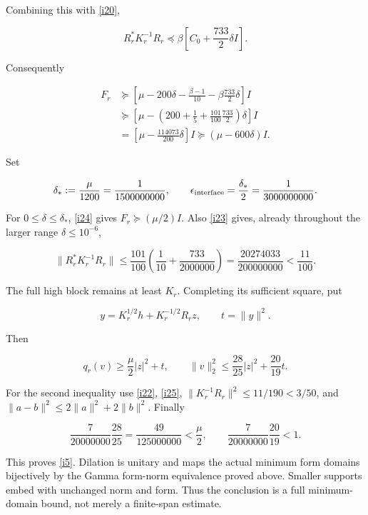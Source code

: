 \documentclass[11pt]{article}
\begin{document}
Combining this with \eqref{i20},

\begin{equation}\label{i23}
R_r^*K_r^{-1}R_r
 \preceq\beta\left[C_0+\frac{733}2\delta I\right].
\end{equation}

Consequently

\begin{equation}\label{i24}
\begin{split}
 F_r&\succeq
 \left[\mu-200\delta-\frac{\beta-1}{10}
                 -\beta\frac{733}2\delta\right]I\\
 &\succeq\left[\mu-
 \left(200+\frac15+\frac{101}{100}\frac{733}2\right)\delta\right]I\\
 &=\left[\mu-\frac{114073}{200}\delta\right]I
 \succeq(\mu-600\delta)I.
 \end{split}
\end{equation}

Set

\[
 \delta_*:=\frac\mu{1200}=\frac1{1500000000},\qquad
 \epsilon_{\rm interface}=\frac{\delta_*}2=\frac1{3000000000}.
\]

For \(0\le\delta\le\delta_*\), \eqref{i24} gives \(F_r\succeq(\mu/2)I\). Also \eqref{i23} gives, already throughout the larger range \(\delta\le10^{-6}\),

\begin{equation}\label{i25}
\|R_r^*K_r^{-1}R_r\|
 \le\frac{101}{100}\left(\frac1{10}+\frac{733}{2000000}\right)
 =\frac{20274033}{200000000}<\frac{11}{100}.
\end{equation}

The full high block remains at least \(K_r\). Completing its sufficient square, put

\[
 y=K_r^{1/2}h+K_r^{-1/2}R_rz,\qquad t=\|y\|^2.
\]

Then

\begin{equation}\label{i26}
q_r(v)\ge\frac\mu2|z|^2+t,
 \qquad
 \|v\|_2^2\le\frac{28}{25}|z|^2+\frac{20}{19}t.
\end{equation}

For the second inequality use \eqref{i22}, \eqref{i25},
\(\|K_r^{-1}R_r\|^2\le11/190<3/50\), and
\(\|a-b\|^2\le2\|a\|^2+2\|b\|^2\). Finally

\[
 \frac7{20000000}\frac{28}{25}
 =\frac{49}{125000000}<\frac\mu2,
 \qquad
 \frac7{20000000}\frac{20}{19}<1.
\]

This proves \eqref{i5}. Dilation is unitary and maps the actual minimum form domains bijectively by the Gamma form-norm equivalence proved above. Smaller supports embed with unchanged norm and form. Thus the conclusion is a full minimum-domain bound, not merely a finite-span estimate.
\end{document}
